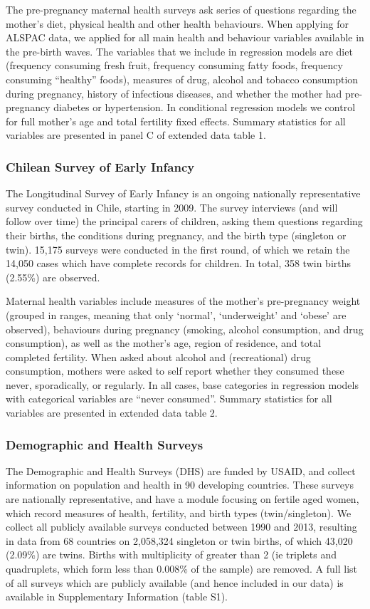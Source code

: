 \documentclass{nature}
\begin{document}
\begin{linenumbers}
The pre-pregnancy maternal health surveys ask series of questions regarding the mother's diet, physical health and other health behaviours.  When applying for ALSPAC data, we applied for all main health and behaviour variables available in the pre-birth waves.  The variables that we include in regression models are diet (frequency consuming fresh fruit, frequency consuming fatty foods, frequency consuming ``healthy'' foods), measures of drug, alcohol and tobacco consumption during pregnancy, history of infectious diseases, and whether the mother had pre-pregnancy diabetes or hypertension.  In conditional regression models we control for full mother's age and total fertility fixed effects.  Summary statistics for all variables are presented in panel C of extended data table 1.

\subsubsection{Chilean Survey of Early Infancy}
The Longitudinal Survey of Early Infancy is an ongoing nationally representative survey conducted in Chile, starting in 2009.  The survey interviews (and will follow over time) the principal carers of children, asking them questions regarding their births, the conditions during pregnancy, and the birth type (singleton or twin).  15,175 surveys were conducted in the first round, of which we retain the 14,050 cases which have complete records for children.  In total, 358 twin births (2.55\%) are observed.

Maternal health variables include measures of the mother's pre-pregnancy weight (grouped in ranges, meaning that only `normal', `underweight' and `obese' are observed), behaviours during pregnancy (smoking, alcohol consumption, and drug consumption), as well as the mother's age, region of residence, and total completed fertility.  When asked about alcohol and (recreational) drug consumption, mothers were asked to self report whether they consumed these never, sporadically, or regularly.  In all cases, base categories in regression models with categorical variables are ``never consumed''.  Summary statistics for all variables are presented in extended data table 2.

\subsubsection{Demographic and Health Surveys}
The Demographic and Health Surveys (DHS) are funded by USAID, and collect information on population and health in 90 developing countries.  These surveys are nationally representative, and have a module focusing on fertile aged women, which record measures of health, fertility, and birth types (twin/singleton).  We collect all publicly available surveys conducted between 1990 and 2013, resulting in data from 68 countries on 2,058,324 singleton or twin births, of which 43,020 (2.09\%) are twins.  Births with multiplicity of greater than 2 (ie triplets and quadruplets, which form less than 0.008\% of the sample) are removed.  A full list of all surveys which are publicly available (and hence included in our data) is available in Supplementary Information (table S1).


\end{linenumbers}
\end{document}
